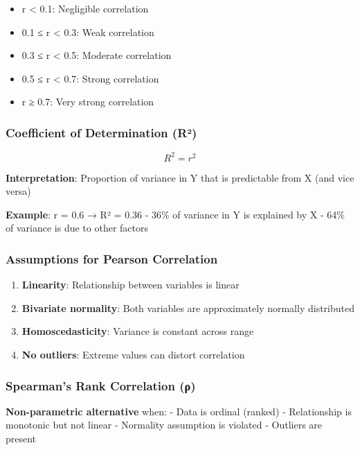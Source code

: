 \documentclass[11pt]{article}
\providecommand{\tightlist}{%
      \setlength{\itemsep}{0pt}\setlength{\parskip}{0pt}}
\begin{document}
\begin{itemize}
\tightlist
\item
  \textbar r\textbar{} \textless{} 0.1: Negligible correlation
\item
  0.1 ≤ \textbar r\textbar{} \textless{} 0.3: Weak correlation
\item
  0.3 ≤ \textbar r\textbar{} \textless{} 0.5: Moderate correlation
\item
  0.5 ≤ \textbar r\textbar{} \textless{} 0.7: Strong correlation
\item
  \textbar r\textbar{} ≥ 0.7: Very strong correlation
\end{itemize}

\subsubsection{Coefficient of Determination
(R²)}\label{coefficient-of-determination-ruxb2}

\[R^2 = r^2\]

\textbf{Interpretation}: Proportion of variance in Y that is predictable
from X (and vice versa)

\textbf{Example}: r = 0.6 → R² = 0.36 - 36\% of variance in Y is
explained by X - 64\% of variance is due to other factors

\subsubsection{Assumptions for Pearson
Correlation}\label{assumptions-for-pearson-correlation}

\begin{enumerate}
\def\labelenumi{\arabic{enumi}.}
\tightlist
\item
  \textbf{Linearity}: Relationship between variables is linear
\item
  \textbf{Bivariate normality}: Both variables are approximately
  normally distributed
\item
  \textbf{Homoscedasticity}: Variance is constant across range
\item
  \textbf{No outliers}: Extreme values can distort correlation
\end{enumerate}

\subsubsection{Spearman's Rank Correlation
(ρ)}\label{spearmans-rank-correlation-ux3c1}

\textbf{Non-parametric alternative} when: - Data is ordinal (ranked) -
Relationship is monotonic but not linear - Normality assumption is
violated - Outliers are present
\end{document}
